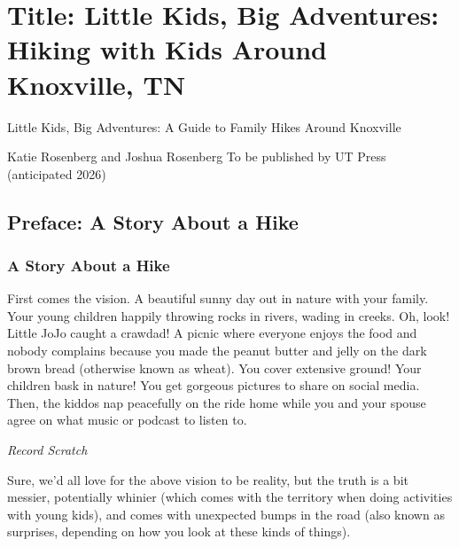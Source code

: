 \documentclass[
  letterpaper,
  DIV=11,
  numbers=noendperiod]{scrartcl}
\author{}
\date{}
\begin{document}
\ifdefined\Shaded\renewenvironment{Shaded}{\begin{tcolorbox}[borderline west={3pt}{0pt}{shadecolor}, boxrule=0pt, breakable, enhanced, frame hidden, sharp corners, interior hidden]}{\end{tcolorbox}}\fi

\hypertarget{title-little-kids-big-adventures-hiking-with-kids-around-knoxville-tn}{%
\section{Title: Little Kids, Big Adventures: Hiking with Kids Around
Knoxville,
TN}\label{title-little-kids-big-adventures-hiking-with-kids-around-knoxville-tn}}

Little Kids, Big Adventures: A Guide to Family Hikes Around Knoxville

Katie Rosenberg and Joshua Rosenberg To be published by UT Press
(anticipated 2026)

\newpage{}

\hypertarget{preface-a-story-about-a-hike}{%
\subsection{Preface: A Story About a
Hike}\label{preface-a-story-about-a-hike}}

\hypertarget{a-story-about-a-hike}{%
\subsubsection{A Story About a Hike}\label{a-story-about-a-hike}}

First comes the vision. A beautiful sunny day out in nature with your
family. Your young children happily throwing rocks in rivers, wading in
creeks. Oh, look! Little JoJo caught a crawdad! A picnic where everyone
enjoys the food and nobody complains because you made the peanut butter
and jelly on the dark brown bread (otherwise known as wheat). You cover
extensive ground! Your children bask in nature! You get gorgeous
pictures to share on social media. Then, the kiddos nap peacefully on
the ride home while you and your spouse agree on what music or podcast
to listen to.

\emph{Record Scratch}

Sure, we'd all love for the above vision to be reality, but the truth is
a bit messier, potentially whinier (which comes with the territory when
doing activities with young kids), and comes with unexpected bumps in
the road (also known as surprises, depending on how you look at these
kinds of things).
\end{document}
